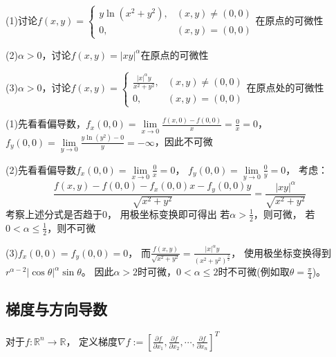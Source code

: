 \begin{exercise}[判断可微性]
  (1)讨论$f(x,y) =
  \begin{cases}
    y \ln (x^2 + y^2), & (x,y) \neq (0,0)\\
    0, & (x,y) = (0,0)
  \end{cases}
  $在原点的可微性

  (2)$\alpha > 0$，讨论$f(x,y) = |xy|^{\alpha}$在原点的可微性

  (3)$\alpha > 0$，讨论$f(x,y) =
  \begin{cases}
    \frac{|x|^{\alpha}y}{x^2 + y^2}, & (x,y) \neq (0,0)\\
    0, &(x,y) = (0,0)
  \end{cases}
  $在原点处的可微性
\end{exercise}

\begin{solution}
  (1)先看看偏导数，$f_x(0,0) = \lim \limits _{x \rightarrow 0}\frac{f(x,0) - f(0,0)}{x} = \frac{0}{x} = 0$，
  $f_y(0,0) = \lim \limits _{y \rightarrow 0}\frac{y \ln(y^2) - 0}{y} = -\infty$，因此不可微

  (2)先看看偏导数$f_x(0,0) = \lim \limits _{x \rightarrow 0}\frac{0}{x} = 0$，
  $f_y(0,0) = \lim \limits _{y \rightarrow 0}\frac{0}{y} = 0$，
  考虑：
  \begin{equation*}
    \frac{f(x,y) - f(0,0) - f_x(0,0) x - f_y(0,0)y}{\sqrt{x^2 + y^2}} = \frac{|xy|^{\alpha}}{\sqrt{x^2 + y^2}}
  \end{equation*}
  考察上述分式是否趋于$0$，
  用极坐标变换即可得出
  若$\alpha > \frac{1}{2}$，则可微，
  若$0 < \alpha \leq \frac{1}{2}$，则不可微

  (3)$f_x(0,0) = f_y(0,0) = 0$，
  而$\frac{f(x,y)}{\sqrt{x^2 + y^2}} =  \frac{|x|^{\alpha} y}{(x^2 + y^2)^{\frac{3}{2}}}$，
  使用极坐标变换得到
  $r^{\alpha - 2} |\cos \theta|^{\alpha} \sin \theta$。
  因此$\alpha > 2$时可微，$0 < \alpha \leq 2$时不可微(例如取$\theta = \frac{\pi}{4}$)。
\end{solution}


\subsection{梯度与方向导数}

\begin{definition}[梯度]
  对于$f:\mathbb{R}^n \rightarrow \mathbb{R}$，
  定义梯度$\nabla f := [\frac{\partial f}{\partial x_1}, \frac{\partial f}{\partial x_2},\cdots,\frac{\partial f}{\partial x_n}]^T$
\end{definition}

